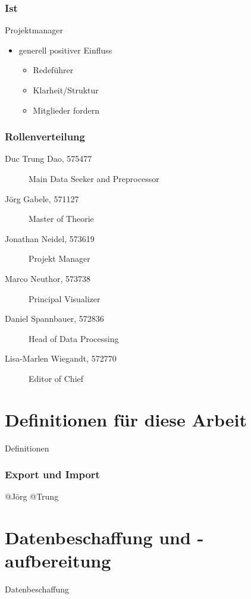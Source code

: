 \documentclass{beamer}
\begin{document}
\begin{frame}
\frametitle{Ist}
Projektmanager
  \begin{itemize}
    \item generell positiver Einfluss
      \begin{itemize}
        \item  Redeführer
        \item  Klarheit/Struktur
        \item  Mitglieder fordern
      \end{itemize}
  \end{itemize}
\end{frame}

\begin{frame}
	\frametitle{Rollenverteilung}
	\begin{description}
		\item[Duc Trung Dao, 575477]Main Data Seeker and Preprocessor
		\item[Jörg Gabele, 571127]Master of Theorie
		\item[Jonathan Neidel, 573619]Projekt Manager
		\item[Marco Neuthor, 573738]Principal Visualizer
		\item[Daniel Spannbauer, 572836]Head of Data Processing
		\item[Lisa-Marlen Wiegandt, 572770]Editor of Chief
	\end{description}
    \end{frame}

\section{Definitionen für diese Arbeit}
\begin{frame}
	\begin{center}
		{\Huge Definitionen}
	\end{center}
\end{frame}

\begin{frame}
\frametitle{Export und Import}
	@Jörg @Trung
\end{frame}

\section{Datenbeschaffung und -aufbereitung}
\begin{frame}
	\begin{center}
		{\Huge Datenbeschaffung}
	\end{center}
\end{frame}
\end{document}
